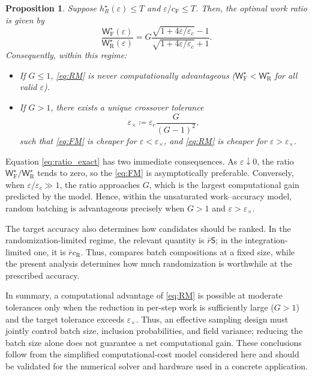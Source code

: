 \documentclass[twoside,11pt]{article}
\theoremstyle{plain}
\newtheorem{proposition}[theorem]{Proposition}
\begin{document}
\begin{proposition}\label{prop:relativecost}
Suppose $h_R^\star(\varepsilon) \le T$ and $\varepsilon/c_{\mathrm{F}} \le T$. Then, the optimal work ratio is given by
\begin{equation}\label{eq:ratio_exact}
\frac{\mathsf W_{\mathrm{F}}^\star(\varepsilon)}{\mathsf W_{\mathrm{R}}^\star(\varepsilon)} = G \frac{\sqrt{1+4\varepsilon/\varepsilon_c}-1}{\sqrt{1+4\varepsilon/\varepsilon_c}+1}.
\end{equation}
Consequently, within this regime:
\begin{itemize}
    \item If $G \le 1$, \eqref{eq:RM} is never computationally advantageous ($\mathsf W_{\mathrm{F}}^\star < \mathsf W_{\mathrm{R}}^\star$ for all valid $\varepsilon$).
    \item If $G > 1$, there exists a unique crossover tolerance 
    \begin{equation}\label{eq:crossover_tolerance}
    \varepsilon_\times \coloneqq \varepsilon_c \frac{G}{(G-1)^2},
    \end{equation}
    such that \eqref{eq:FM} is cheaper for $\varepsilon < \varepsilon_\times$, and \eqref{eq:RM} is cheaper for $\varepsilon > \varepsilon_\times$.
\end{itemize}
\end{proposition}

Equation \eqref{eq:ratio_exact} has two immediate consequences. As $\varepsilon\downarrow0$, the ratio $\mathsf W_{\mathrm F}^\star/\mathsf W_{\mathrm R}^\star$ tends to zero, so the \eqref{eq:FM} is asymptotically preferable. Conversely, when $\varepsilon/\varepsilon_c\gg1$, the ratio approaches $G$, which is the largest computational gain predicted by the model. Hence, within the unsaturated work--accuracy model, random batching is advantageous precisely when $G>1$ and $\varepsilon>\varepsilon_\times$.

The target accuracy also determines how candidates should be ranked. In the randomization-limited regime, the relevant quantity is $\bar r\mathsf S$; in the integration-limited one, it is $\bar r c_{\mathrm R}$. Thus,  compares batch compositions at a fixed size, while the present analysis determines how much randomization is worthwhile at the prescribed accuracy.

In summary, a computational advantage of \eqref{eq:RM} is possible at moderate tolerances only when the reduction in per-step work is sufficiently large ($G>1$) and the target tolerance exceeds $\varepsilon_\times$. Thus, an effective sampling design must jointly control batch size, inclusion probabilities, and field variance; reducing the batch size alone does not guarantee a net computational gain. These conclusions follow from the simplified computational-cost model considered here and should be validated for the numerical solver and hardware used in a concrete application.
\end{document}
